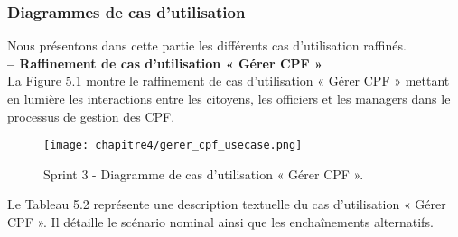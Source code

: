 \subsubsection{Diagrammes de cas d'utilisation}
Nous présentons dans cette partie les différents cas d'utilisation raffinés.\\

\textbf{– Raffinement de cas d'utilisation « Gérer CPF »}\\
La Figure 5.1 montre le raffinement de cas d'utilisation « Gérer CPF » mettant en lumière
les interactions entre les citoyens, les officiers et les managers dans le processus de gestion des CPF.

\begin{figure}[H]
\centering
\texttt{[image: chapitre4/gerer\_cpf\_usecase.png]}
\caption{ Sprint 3 - Diagramme de cas d'utilisation « Gérer CPF ». }
\end{figure}

Le Tableau 5.2 représente une description textuelle du cas d'utilisation « Gérer CPF ». Il
détaille le scénario nominal ainsi que les enchaînements alternatifs.

